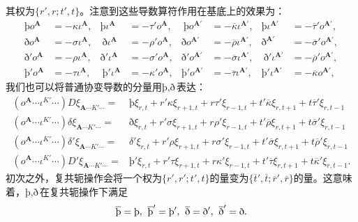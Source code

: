 其权为$\{r',r;t',t\}$。注意到这些导数算符作用在基底上的效果为：
\begin{equation*}
	\begin{aligned}
		\text{þ}o^{\boldsymbol{A}} & =-\kappa \iota ^{\boldsymbol{A}} , & \text{þ}\iota ^{\boldsymbol{A}} & =-\tau 'o^{\boldsymbol{A}} , & \ \text{þ}o^{\boldsymbol{A} '} & =-\overline{\kappa } \iota ^{\boldsymbol{A} '} , & \text{þ}\iota ^{\boldsymbol{A} '} & =-\overline{\tau } 'o^{\boldsymbol{A} '} ,\\
		\text{ð} o^{\boldsymbol{A}} & =-\sigma \iota ^{\boldsymbol{A}} , & \ \text{ð} \iota ^{\boldsymbol{A}} & =-\rho 'o^{\boldsymbol{A}} , & \text{ð} o^{\boldsymbol{A} '} & =-\overline{\rho } \iota ^{\boldsymbol{A} '} , & \text{ð} ^{\boldsymbol{A} '} & =-\overline{\sigma } 'o^{\boldsymbol{A} '} ,\\
		\text{ð} 'o^{\boldsymbol{A}} & =-\rho \iota ^{\boldsymbol{A}} , & \text{ð} '\iota ^{\boldsymbol{A}} & =-\sigma 'o^{\boldsymbol{A}} , & \text{ð} 'o^{\boldsymbol{A} '} & =-\overline{\sigma } \iota ^{\boldsymbol{A} '} , & \ \text{ð} '\iota ^{\boldsymbol{A} '} & =-\overline{\rho } 'o^{\boldsymbol{A} '} ,\\
		\text{þ}'o^{\boldsymbol{A}} & =-\tau \iota ^{\boldsymbol{A}} , & \ \text{þ}'\iota ^{\boldsymbol{A}} & =-\kappa 'o^{\boldsymbol{A}} , & \text{þ}'o^{\boldsymbol{A} '} & =-\overline{\tau } \iota ^{\boldsymbol{A} '} , & \text{þ}'\iota ^{\boldsymbol{A} '} & =-\overline{\kappa } o^{\boldsymbol{A} '} ,
	\end{aligned}
\end{equation*}
我们也可以将普通协变导数的分量用$\text{þ},\text{ð} $表达：
\begin{equation*}
	\begin{aligned}
		(o^{\boldsymbol{A}} \cdots \iota ^{K'} \cdots )D\xi _{\boldsymbol{A} \cdots K'\cdots } = & \text{þ}\xi _{r,t} +r'\kappa \xi _{r+1,t} +r\tau '\xi _{r-1,t} +t'\overline{\kappa } \xi _{r,t+1} +t\overline{\tau } '\xi _{r,t-1}\\
		(o^{\boldsymbol{A}} \cdots \iota ^{K'} \cdots )\delta \xi _{\boldsymbol{A} \cdots K'\cdots } = & \text{ð} \xi _{r,t} +r'\sigma \xi _{r+1,t} +r\rho '\xi _{r-1,t} +t'\overline{\rho } \xi _{r,t+1} +t\overline{\sigma } '\xi _{r,t-1}\\
		(o^{\boldsymbol{A}} \cdots \iota ^{K'} \cdots )\delta '\xi _{\boldsymbol{A} \cdots K'\cdots } = & \delta '\xi _{r,t} +r'\rho \xi _{r+1,t} +r\sigma '\xi _{r-1,t} +t'\overline{\sigma } \xi _{r,t+1} +t\overline{\rho } '\xi _{r,t-1}\\
		(o^{\boldsymbol{A}} \cdots \iota ^{K'} \cdots )D'\xi _{\boldsymbol{A} \cdots K'\cdots } = & \text{þ}'\xi _{r,t} +r'\tau \xi _{r+1,t} +r\kappa '\xi _{r-1,t} +t'\overline{\tau } \xi _{r,t+1} +t\overline{\kappa } '\xi _{r,t-1} .
	\end{aligned}
\end{equation*}
初次之外，复共轭操作会将一个权为$\{r',r';t',t\}$的量变为$\{\overline{t} ',\overline{t} ;\overline{r} ',\overline{r}\}$的量。这意味着，$\text{þ},\text{ð} $在复共轭操作下满足
\begin{equation*}
	\overline{\text{þ}} =\text{þ},\kern+0.4em \overline{\text{þ}} '=\text{þ}',\kern+0.4em \overline{\text{ð} } =\text{ð} ',\kern+0.4em \overline{\text{ð} } '=\text{ð} .
\end{equation*}
